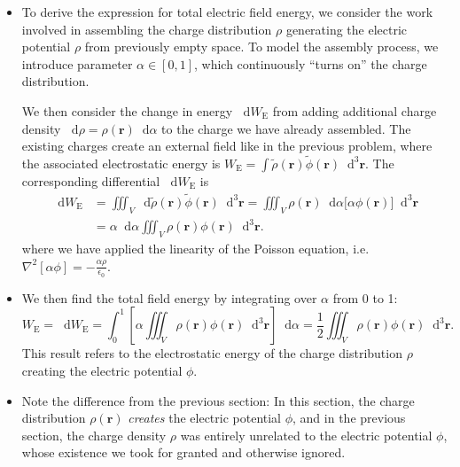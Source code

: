 \documentclass[11pt, a4paper]{article}
\newcommand{\diff}{\mathop{}\!\mathrm{d}} %
\newcommand{\dr}{\diff^{3} \r}  %
\renewcommand{\vec}[1]{\bm{#1}} %
\renewcommand{\t}[1]{\tilde{#1}} %
\renewcommand{\r}{\vec{r}}
\newcommand{\ee}{\epsilon_{0}}  %
\renewcommand{\laplacian}{\nabla^{2}}
\begin{document}
\begin{itemize}


	\item To derive the expression for total electric field energy, we consider the work involved in assembling the charge distribution $ \rho $ generating the electric potential $ \rho $ from previously empty space. To model the assembly process, we introduce parameter $ \alpha \in [0, 1] $, which continuously ``turns on'' the charge distribution. 

	We then consider the change in energy $ \diff W_{\text{E}} $ from adding additional charge density $ \diff \rho = \rho(\r) \diff \alpha $ to the charge we have already assembled. The existing charges create an external field like in the previous problem, where the associated electrostatic energy is $ W_{\text{E}} = \int \t{\rho}(\r) \t{\phi} (\r) \dr $. 	The corresponding differential $ \diff W_{\text{E}} $ is
	\begin{align*}
		\diff W_{\text{E}} &= \iiint_{V} \diff \t{\rho}(\r)\t{\phi}(\r) \dr = \iiint_{V} \rho(\r) \diff\alpha \big[\alpha \phi (\r)\big ] \dr \\
		& = \alpha \diff \alpha \iiint_{V} \rho(\r) \phi(\r) \dr.
	\end{align*}
	where we have applied the linearity of the Poisson equation, i.e. $ \laplacian [\alpha \phi] = - \frac{\alpha \rho }{\ee} $. 
	
	\item We then find the total field energy by integrating over $ \alpha $ from 0 to 1:
	\begin{equation*}
		W_{\text{E}} = \diff W_{\text{E}} = \int_{0}^{1} \left[ \alpha \iiint_{V} \rho(\r) \phi(\r) \dr \right] \diff \alpha = \frac{1}{2} \iiint_{V} \rho(\r) \phi(\r) \dr.
	\end{equation*}
	This result refers to the electrostatic energy of the charge distribution $ \rho $ creating the electric potential $ \phi $.
	
	\item Note the difference from the previous section: In this section, the charge distribution $ \rho(\r) $ \textit{creates} the electric potential $ \phi $, and in the previous section, the charge density $ \rho $ was entirely unrelated to the electric potential $ \phi $, whose existence we took for granted and otherwise ignored.
	

\end{itemize}
\end{document}
